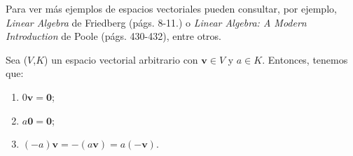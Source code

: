 \documentclass[apuntes]{subfiles}
\begin{document}
Para ver más ejemplos de espacios vectoriales pueden consultar, por ejemplo, \emph{Linear Algebra} de Friedberg (págs. 8-11.) o \emph{Linear Algebra: A Modern Introduction} de Poole (págs. 430-432), entre otros. \\

\begin{teo}\label{teo:1.8}
    Sea ($V$,$K$) un espacio vectorial arbitrario con $\mathbf{v}\in V$ y $a\in K$. Entonces, tenemos que:
    \begin{enumerate}[label=(\alph*)]

        \item $0\mathbf{v}=\mathbf{0}$;

        \item $a\mathbf{0}=\mathbf{0}$;

        \item $(-a)\mathbf{v}=-(a\mathbf{v})=a(-\mathbf{v})$.
    \end{enumerate}
\end{teo}
\end{document}
